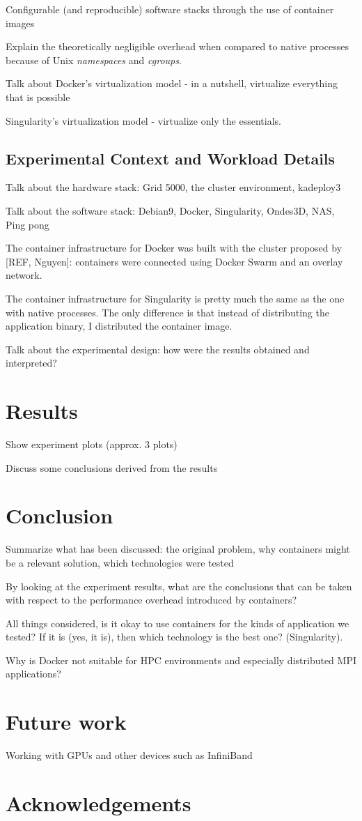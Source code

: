 \documentclass[12pt]{article}
\begin{document}
Configurable (and reproducible) software stacks through the use of container images

Explain the theoretically negligible overhead when compared to native processes because of Unix \textit{namespaces} and \textit{cgroups}.

Talk about Docker's virtualization model - in a nutshell, virtualize everything that is possible

Singularity's virtualization model - virtualize only the essentials.

\subsection{Experimental Context and Workload Details}
Talk about the hardware stack: Grid 5000, the cluster environment, kadeploy3

Talk about the software stack: Debian9, Docker, Singularity, Ondes3D, NAS, Ping pong

The container infrastructure for Docker was built with the cluster proposed by [REF, Nguyen]: containers were connected using Docker Swarm and an overlay network.

The container infrastructure for Singularity is pretty much the same as the one with native processes. The only difference is that instead of distributing the application binary, I distributed the container image.

Talk about the experimental design: how were the results obtained and interpreted?

\section{Results}
Show experiment plots (approx. 3 plots)

Discuss some conclusions derived from the results

\section{Conclusion}
Summarize what has been discussed: the original problem, why containers might be a relevant solution, which technologies were tested

By looking at the experiment results, what are the conclusions that can be taken with respect to the performance overhead introduced by containers?

All things considered, is it okay to use containers for the kinds of application we tested? If it is (yes, it is), then which technology is the best one? (Singularity).

Why is Docker not suitable for HPC environments and especially distributed MPI applications? 

\section{Future work}
Working with GPUs and other devices such as InfiniBand

\section{Acknowledgements}



\end{document}
